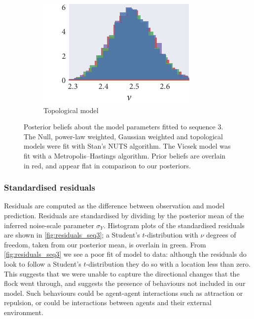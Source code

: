 \begin{figure}[p]
\begin{subfigure}[b]{\textwidth}
    \includegraphics{seq3/top_hist_nu.pdf}%
    \caption{Topological model}
  \end{subfigure}
  \vspace{-2em}
  \caption{Posterior beliefs about the model parameters fitted to sequence 3.
    The Null, power-law weighted, Gaussian weighted and topological models were
    fit with Stan's NUTS algorithm. The Vicsek model was fit with a
    Metropolis--Hastings algorithm. Prior beliefs are overlain in red, and
    appear flat in comparison to our posteriors.}
  \label{fig:posteriors_seq3}
\end{figure}

\subsubsection{Standardised residuals}

Residuals are computed as the difference between observation and model
prediction. Residuals are standardised by dividing by the posterior mean of the
inferred noise-scale parameter $\sigma_Y$. Histogram plots of the standardised
residuals are shown in \cref{fig:residuals_seq3}; a Student's $t$-distribution
with $\nu$ degrees of freedom, taken from our posterior mean, is overlain in
green. From \cref{fig:residuals_seq3} we see a poor fit of model to data:
although the residuals do look to follow a Student's $t$-distribution they do
so with a location less than zero. This suggests that we were unable to capture
the directional changes that the flock went through, and suggests the presence
of behaviours not included in our model. Such behaviours could be agent-agent
interactions such as attraction or repulsion, or could be interactions between
agents and their external environment.

